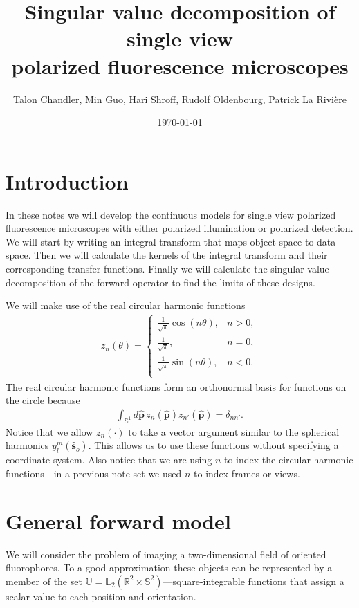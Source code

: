 \documentclass[11pt]{article}
\providecommand{\so}[1]{\mathbf{\hat{s}}_o}
\providecommand{\mh}[1]{\mathbf{\hat{#1}}}
\providecommand{\mbb}[1]{\mathbb{#1}}
\begin{document}
\title{\vspace{-2.5em} Singular value decomposition of single view\\ polarized
  fluorescence microscopes\vspace{-1em}} \author{Talon Chandler, Min Guo, Hari
  Shroff, Rudolf Oldenbourg, Patrick La Rivi\`ere}
\date{\vspace{-1em}\today\vspace{-1em}}
\maketitle
\section{Introduction}
In these notes we will develop the continuous models for single view polarized
fluorescence microscopes with either polarized illumination or polarized
detection. We will start by writing an integral transform that maps object space
to data space. Then we will calculate the kernels of the integral transform and
their corresponding transfer functions. Finally we will calculate the singular
value decomposition of the forward operator to find the limits of these designs.

\noindent We will make use of the real circular harmonic functions
\begin{align}
  z_n(\theta) =
  \begin{cases}
    \frac{1}{\sqrt{\pi}}\cos(n\theta), & n > 0,\\
    \frac{1}{\sqrt{\pi}}, & n = 0,\\
    \frac{1}{\sqrt{\pi}}\sin(n\theta), & n < 0.\\
  \end{cases}
\end{align}
The real circular harmonic functions form an orthonormal basis for functions on
the circle because
\begin{align}
  \int_{\mbb{S}^1}d\mh{p}\, z_n(\mh{p})z_{n'}(\mh{p}) = \delta_{nn'}.
\end{align}
Notice that we allow $z_n(\cdot)$ to take a vector argument similar to the
spherical harmonics $y_l^m(\so{})$. This allows us to use these functions
without specifying a coordinate system. Also notice that we are using $n$ to
index the circular harmonic functions---in a previous note set we used $n$ to
index frames or views.

\section{General forward model}
We will consider the problem of imaging a two-dimensional field of oriented
fluorophores. To a good approximation these objects can be represented by a
member of the set
$\mbb{U} = \mbb{L}_2(\mbb{R}^2 \times \mbb{S}^2)$---square-integrable functions
that assign a scalar value to each position and orientation.
\end{document}
